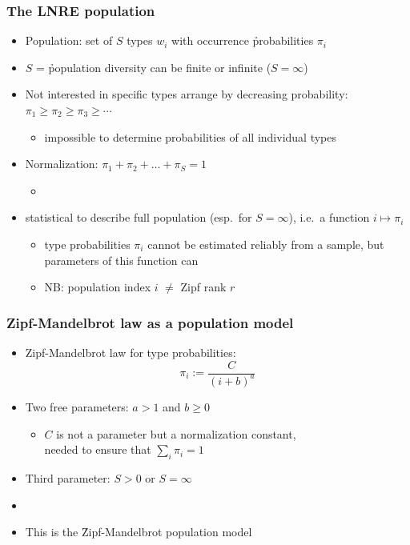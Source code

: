 \documentclass[handout,notes=show,t]{beamer} %
\begin{document}
\begin{frame}
  \frametitle{The LNRE population}

  \begin{itemize}
  \item Population: set of $S$ types $w_i$ with occurrence \h{probabilities} $\pi_i$
  \item $S$ = \h{population diversity} can be finite or infinite ($S = \infty$)
  \item Not interested in specific types \so  arrange by decreasing
    probability: $\pi_1\geq \pi_2\geq \pi_3 \geq \cdots$
    \begin{itemize}
    \item[\hand] impossible to determine probabilities of all individual types
    \end{itemize}
  \item Normalization: $\pi_1 + \pi_2 + \ldots + \pi_S = 1$
    \begin{itemize}
    \item[]
    \end{itemize}
  \item {} statistical  to describe full population (esp.\ for $S = \infty$),
    i.e.\ a function $i \mapsto \pi_i$
    \begin{itemize}
    \item type probabilities $\pi_i$ cannot be estimated reliably from a sample, but parameters of this function can
    \item NB: population index $i$ $\neq$ Zipf rank $r$
    \end{itemize}
  \end{itemize}
\end{frame}

\begin{frame}
  \frametitle{Zipf-Mandelbrot law as a population model}

  \begin{itemize}
  \item Zipf-Mandelbrot law for type probabilities:
    \[ \pi_i := \frac{C}{(i + b) ^ a} \]
  \item Two free parameters: $a > 1$ and $b \geq 0$
    \begin{itemize}
    \item[\hand] $C$ is not a parameter but a normalization constant,\\
      needed to ensure that $\sum_i \pi_i = 1$
    \end{itemize}
  \item Third parameter: $S > 0$ or $S = \infty$
  \item[]
  \item This is the \h{Zipf-Mandelbrot} population model \citep{Evert:04}
  \end{itemize}
\end{frame}
\end{document}
